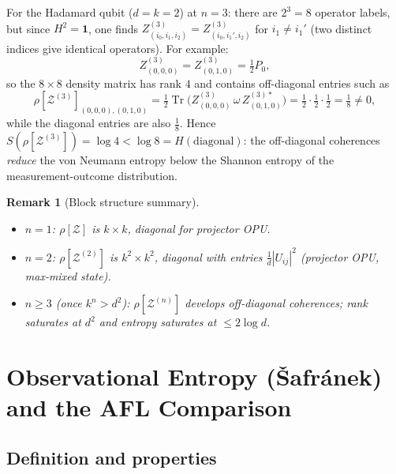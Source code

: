 \documentclass[12pt,a4paper]{article}
\newtheorem{remark}[theorem]{Remark}
\DeclareMathOperator{\Tr}{Tr}
\begin{document}
For the Hadamard qubit ($d=k=2$) at $n=3$: there are $2^3=8$ operator labels,
but since $H^2=\mathbf{1}$, one finds
$Z^{(3)}_{(i_0,i_1,i_2)}=Z^{(3)}_{(i_0,i_1',i_2)}$ for $i_1\neq i_1'$
(two distinct indices give identical operators).  For example:
\begin{equation}
  Z^{(3)}_{(0,0,0)}
  = Z^{(3)}_{(0,1,0)}
  = \tfrac{1}{2}P_0,
\end{equation}
so the $8\times 8$ density matrix has rank $4$ and contains off-diagonal
entries such as
\begin{equation}
  \rho[\mathcal{Z}^{(3)}]_{(0,0,0),(0,1,0)}
  = \tfrac{1}{2}\Tr\!\bigl(Z^{(3)}_{(0,0,0)}\,\omega\,Z^{(3)*}_{(0,1,0)}\bigr)
  = \tfrac{1}{2}\cdot\tfrac{1}{2}\cdot\tfrac{1}{2}
  = \tfrac{1}{8} \neq 0,
\end{equation}
while the diagonal entries are also $\frac{1}{8}$.  Hence
$S(\rho[\mathcal{Z}^{(3)}]) = \log 4 < \log 8 = H(\text{diagonal})$:
the off-diagonal coherences \emph{reduce} the von Neumann entropy below the
Shannon entropy of the measurement-outcome distribution.

\begin{remark}[Block structure summary]
\begin{itemize}
  \item $n=1$: $\rho[\mathcal{Z}]$ is $k\times k$, diagonal for projector OPU.
  \item $n=2$: $\rho[\mathcal{Z}^{(2)}]$ is $k^2\times k^2$, diagonal with
        entries $\frac{1}{d}|U_{ij}|^2$ (projector OPU, max-mixed state).
  \item $n\geq 3$ (once $k^n>d^2$): $\rho[\mathcal{Z}^{(n)}]$ develops off-diagonal
        coherences; rank saturates at $d^2$ and entropy saturates at $\leq 2\log d$.
\end{itemize}
\end{remark}

\section{Observational Entropy (Šafránek) and the AFL Comparison}
\label{sec:obs_entropy}

\subsection{Definition and properties}
\end{document}
